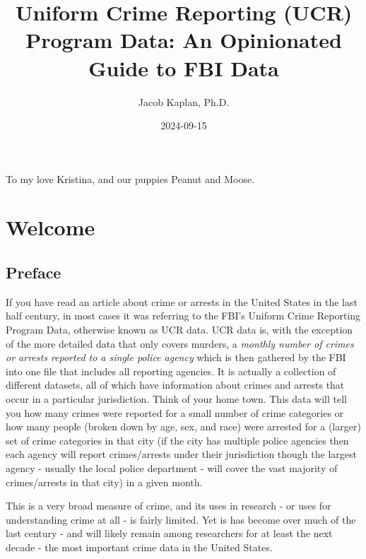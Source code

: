 \documentclass[
]{krantz}
\title{Uniform Crime Reporting (UCR) Program Data: An
Opinionated Guide to FBI Data}
\author{Jacob Kaplan, Ph.D.}
\date{2024-09-15}
\begin{document}
\maketitle

\thispagestyle{empty}
\begin{center}
To my love Kristina, and our puppies Peanut and Moose.
\end{center}

\setlength{\abovedisplayskip}{-5pt}
\setlength{\abovedisplayshortskip}{-5pt}

{
\hypersetup{linkcolor=}
\setcounter{tocdepth}{2}
\tableofcontents
}
\mainmatter

\part{Welcome}\label{part-welcome}

\chapter{Preface}\label{preface}

If you have read an article about crime or arrests in the
United States in the last half century, in most cases it was
referring to the FBI's Uniform Crime Reporting Program Data,
otherwise known as UCR data. UCR data is, with the exception
of the more detailed data that only covers murders, a
\emph{monthly number of crimes or arrests reported to a
single police agency} which is then gathered by the FBI into
one file that includes all reporting agencies. It is
actually a collection of different datasets, all of which
have information about crimes and arrests that occur in a
particular jurisdiction. Think of your home town. This data
will tell you how many crimes were reported for a small
number of crime categories or how many people (broken down
by age, sex, and race) were arrested for a (larger) set of
crime categories in that city (if the city has multiple
police agencies then each agency will report crimes/arrests
under their jurisdiction though the largest agency - usually
the local police department - will cover the vast majority
of crimes/arrests in that city) in a given month.

This is a very broad measure of crime, and its uses in
research - or uses for understanding crime at all - is
fairly limited. Yet is has become over much of the last
century - and will likely remain among researchers for at
least the next decade - the most important crime data in the
United States.
\end{document}
